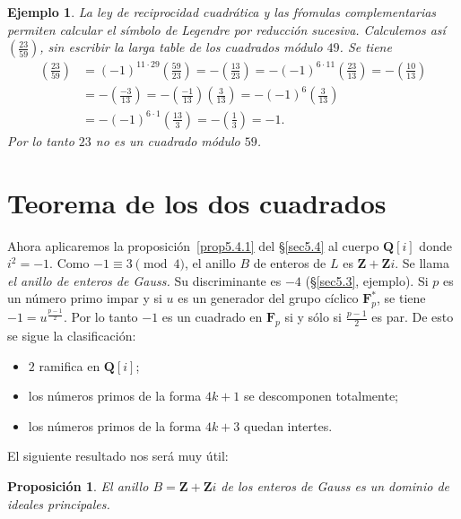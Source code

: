 \documentclass[10pt,oneside,bibtotoc,smallheadings,leqno,a5paper,DIV=12]{scrbook}
\newcommand{\QQ}{\mathbf{Q}}
\newcommand{\ZZ}{\mathbf{Z}}
\newcommand{\FF}{\mathbf{F}}
\newcommand{\leg}[2]{\left(\frac{#1}{#2}\right)}
\numberwithin{equation}{section}
\theoremstyle{defi}
\theoremstyle{enonce}
\newtheorem{proposition}{Proposici\'on}
\theoremstyle{rem}
\newtheorem*{example*}{Ejemplo}
\newtheorem*{remark*}{Observaci\'on}
\numberwithin{theorem}{section}
\numberwithin{proposition}{section}
\numberwithin{definition}{section}
\numberwithin{lemma}{section}
\numberwithin{corollary}{section}
\numberwithin{example}{section}
\numberwithin{footnote}{section}%
\begin{document}
\begin{example*}
La ley de reciprocidad cuadr\'atica y las f\'romulas complementarias permiten calcular el s\'imbolo de Legendre por
reducci\'on sucesiva. Calculemos as\'i $\leg{23}{59}$, sin escribir la larga table de los cuadrados
m\'odulo $49$. Se tiene
\begin{align*}
\leg{23}{59} &= (-1)^{11\cdot 29}\leg{59}{23} = -\leg{13}{23} = -(-1)^{6\cdot 11}\leg{23}{13}=-\leg{10}{13}\\
&= -\leg{-3}{13} = -\leg{-1}{13}\leg{3}{13} =-(-1)^{6}\leg{3}{13}\\
&=-(-1)^{6\cdot 1}\leg{13}{3}=-\leg{1}{3}=-1.
\end{align*}
Por lo tanto $23$ no es un cuadrado m\'odulo $59$.
\end{example*}

\section{Teorema de los dos cuadrados}\label{sec5.6}

Ahora aplicaremos la proposici\'on~\ref{prop5.4.1} del \S\ref{sec5.4} al cuerpo $\QQ[i]$ donde $i^{2}=-1$. Como $-1\equiv 3\pmod 4$,
el anillo $B$ de enteros de $L$ es $\ZZ+\ZZ i$. Se llama {\em el anillo de enteros de Gauss.} Su discriminante
es $-4$ (\S\ref{sec5.3}, ejemplo). Si $p$ es un n\'umero primo impar y si $u$ es un generador del grupo c\'iclico
$\FF_{p}^{*}$, se tiene $-1=u^{\frac{p-1}{2}}$. Por lo tanto $-1$ es un cuadrado en $\FF_{p}$ si y s\'olo si
$\frac{p-1}{2}$ es par. De esto se sigue la clasificaci\'on:
\begin{itemize}
\item $2$ ramifica en $\QQ[i]$;
\item los n\'umeros primos de la forma $4k+1$ se descomponen totalmente;
\item los n\'umeros primos de la forma $4k+3$ quedan intertes.
\end{itemize}
El siguiente resultado nos ser\'a muy \'util:

\begin{proposition}\label{prop5.6.1}
El anillo $B = \ZZ+\ZZ i$ de los enteros de Gauss es un dominio de ideales principales.
\end{proposition}
\end{document}

